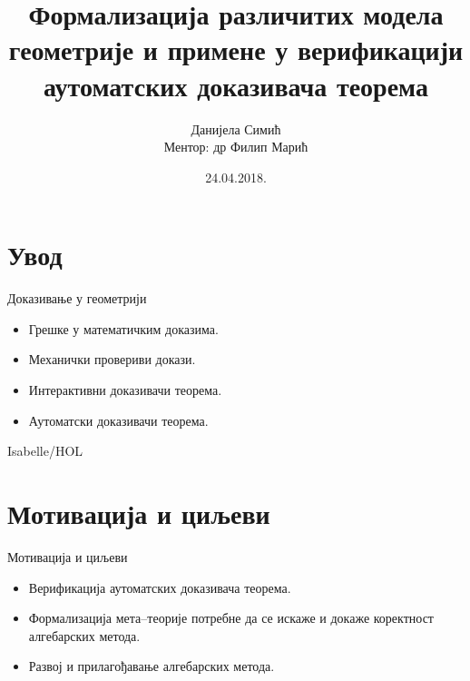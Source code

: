 \documentclass[slidestop, compress, mathserif, containsverbatim, xcolor=dvipsnames]{beamer}
\title{Формализација различитих модела геометрије и примене у
  верификацији аутоматских доказивача теорема}
\author[Данијела Симић]{Данијела Симић\\{\small Ментор: др Филип Марић}}
\institute{Математички факултет \\ Универзитет у Београду}
\date{24.04.2018.}
\begin{document}
\begin{frame}
\titlepage
\end{frame}

\section{Увод}

\begin{frame}{Доказивање у геометрији}
  \begin{itemize}
  \item Грешке у математичким доказима. \vfill
  \item Механички провериви докази. \vfill
  \item Интерактивни доказивачи теорема. \vfill
  \item Аутоматски доказивачи теорема. \vfill
  \end{itemize}
\end{frame}


{
\begin{frame}[plain]{Isabelle/HOL}
\end{frame}
}


\section{Мотивација и циљеви}

\begin{frame}{Мотивација и циљеви}
  \begin{itemize}
  \item Верификација аутоматских доказивача теорема. \vfill
  \item Формализација мета--теорије потребне да се искаже и докаже
    коректност алгебарских метода. \vfill
  \item Развој и прилагођавање алгебарских метода.
  \end{itemize}
\end{frame}
\end{document}
